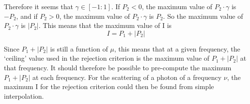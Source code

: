 \documentclass[11pt]{article}
\begin{document}
Therefore it seems that $\gamma\in[-1:1]$. If $P_2 < 0$, the maximum value of $P_2\cdot\gamma$ is $-P_2$, and if $P_2 > 0$, the maximum value of $P_2\cdot\gamma$ is $P_2$. So the maximum value of $P_2\cdot\gamma$ is $|P_2|$. This means that the maximum value of I is
\begin{equation*}
I = P_1 + |P_2|
\end{equation*}

Since $P_1 + |P_2|$ is still a function of $\mu$, this means that at a given frequency, the `ceiling' value used in the rejection criterion is the maximum value of $P_1 + |P_2|$ at that frequency. It should therefore be possible to pre-compute the maximum $P_1 + |P_2|$ at each frequency. For the scattering of a photon of a frequency $\nu$, the maximum I for the rejection criterion could then be found from simple interpolation.
\end{document}
